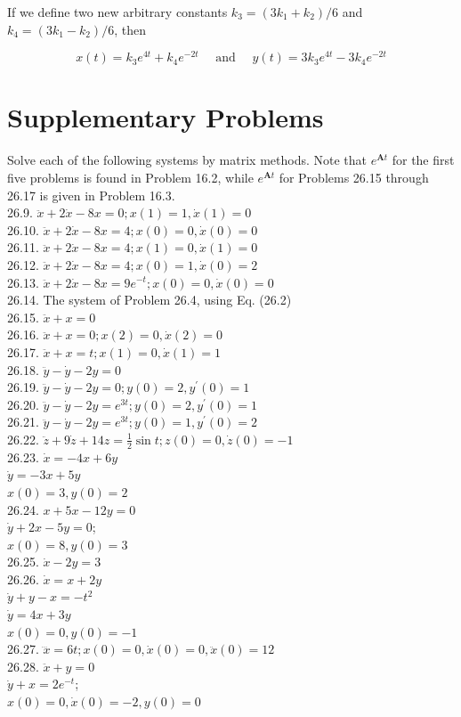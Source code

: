 \documentclass[10pt]{article}
\begin{document}
If we define two new arbitrary constants $k_{3}=\left(3 k_{1}+k_{2}\right) / 6$ and $k_{4}=\left(3 k_{1}-k_{2}\right) / 6$, then

$$
x(t)=k_{3} e^{4 t}+k_{4} e^{-2 t} \quad \text { and } \quad y(t)=3 k_{3} e^{4 t}-3 k_{4} e^{-2 t}
$$

\section*{Supplementary Problems}
Solve each of the following systems by matrix methods. Note that $e^{\mathbf{A} t}$ for the first five problems is found in Problem 16.2, while $e^{\mathbf{A} t}$ for Problems 26.15 through 26.17 is given in Problem 16.3.\\
26.9. $\ddot{x}+2 \dot{x}-8 x=0 ; x(1)=1, \dot{x}(1)=0$\\
26.10. $\ddot{x}+2 \dot{x}-8 x=4 ; x(0)=0, \dot{x}(0)=0$\\
26.11. $\ddot{x}+2 \dot{x}-8 x=4 ; x(1)=0, \dot{x}(1)=0$\\
26.12. $\ddot{x}+2 \dot{x}-8 x=4 ; x(0)=1, \dot{x}(0)=2$\\
26.13. $\ddot{x}+2 \dot{x}-8 x=9 e^{-t} ; x(0)=0, \dot{x}(0)=0$\\
26.14. The system of Problem 26.4, using Eq. (26.2)\\
26.15. $\ddot{x}+x=0$\\
26.16. $\ddot{x}+x=0 ; x(2)=0, \dot{x}(2)=0$\\
26.17. $\ddot{x}+x=t ; x(1)=0, \dot{x}(1)=1$\\
26.18. $\ddot{y}-\dot{y}-2 y=0$\\
26.19. $\ddot{y}-\dot{y}-2 y=0 ; y(0)=2, y^{\prime}(0)=1$\\
26.20. $\ddot{y}-\dot{y}-2 y=e^{3 t} ; y(0)=2, y^{\prime}(0)=1$\\
26.21. $\ddot{y}-\dot{y}-2 y=e^{3 t} ; y(0)=1, y^{\prime}(0)=2$\\
26.22. $\ddot{z}+9 \dot{z}+14 z=\frac{1}{2} \sin t ; z(0)=0, \dot{z}(0)=-1$\\
26.23. $\dot{x}=-4 x+6 y$\\
$\dot{y}=-3 x+5 y$\\
$x(0)=3, y(0)=2$\\
26.24. $x+5 x-12 y=0$\\
$\dot{y}+2 x-5 y=0$;\\
$x(0)=8, y(0)=3$\\
26.25. $\dot{x}-2 y=3$\\
26.26. $\dot{x}=x+2 y$\\
$\dot{y}+y-x=-t^{2}$\\
$\dot{y}=4 x+3 y$\\
$x(0)=0, y(0)=-1$\\
26.27. $\dddot{x}=6 t ; x(0)=0, \dot{x}(0)=0, \ddot{x}(0)=12$\\
26.28. $\ddot{x}+y=0$\\
$\dot{y}+x=2 e^{-t}$;\\
$x(0)=0, \dot{x}(0)=-2, y(0)=0$
\end{document}
